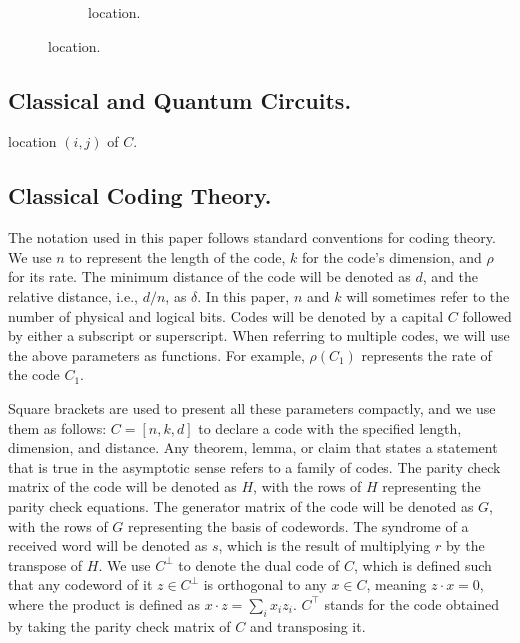 \documentclass[manuscript,screen,review]{acmart}
\begin{document}
{\begin{figure}[h]
\begin{subfigure}[h]{0.30\textwidth}
    \caption{location.}
    \label{fig:location}
    \end{subfigure} 
  \end{figure}

  \subsection{Classical and Quantum Circuits.} 
  \begin{definition}
    location $(i,j)$ of $C$. 
  \end{definition}

%    


  \subsection{Classical Coding Theory.} \label{sec:classical} The notation used in this paper follows standard conventions for coding theory. We use $n$ to represent the length of the code, $k$ for the code's dimension, and $\rho$ for its rate. The minimum distance of the code will be denoted as $d$, and the relative distance, i.e., $d/n$, as $\delta$. In this paper, $n$ and $k$ will sometimes refer to the number of physical and logical bits. Codes will be denoted by a capital $C$ followed by either a subscript or superscript. When referring to multiple codes, we will use the above parameters as functions. For example, $\rho(C_{1})$ represents the rate of the code $C_{1}$.

Square brackets are used to present all these parameters compactly, and we use them as follows: $C=[n,k,d]$ to declare a code with the specified length, dimension, and distance. Any theorem, lemma, or claim that states a statement that is true in the asymptotic sense refers to a family of codes. The parity check matrix of the code will be denoted as $H$, with the rows of $H$ representing the parity check equations. The generator matrix of the code will be denoted as $G$, with the rows of $G$ representing the basis of codewords. The syndrome of a received word will be denoted as $s$, which is the result of multiplying $r$ by the transpose of $H$. We use $C^\perp$ to denote the dual code of $C$, which is defined such that any codeword of it $z\in C^\perp$ is orthogonal to any $x\in C$, meaning $z\cdot x = 0$, where the product is defined as $x\cdot z = \sum_{i}{x_{i}z_{i}}$. $C^{\top}$ stands for the code obtained by taking the parity check matrix of $C$ and transposing it.

}
\end{document}
